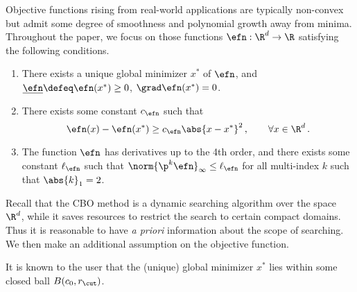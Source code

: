 \documentclass{amsart}
\begin{document}
Objective functions rising from real-world applications are typically non-convex but admit some degree of smoothness and polynomial growth away from minima. 
Throughout the paper, we focus on those functions $\efn: \R^d \to \R$ satisfying the following conditions. 
\begin{condition}
	\label{cd:efn-property}
	\begin{enumerate}
		\item There exists a unique global minimizer $x^\ast$ of $\efn$, and $\underline{\efn} \defeq \efn(x^\ast) \ge 0$, $\grad \efn(x^\ast) = 0$. 
		\item There exists some constant $c_\efn$ such that 
		\begin{equation*}
			\efn(x) - \efn(x^\ast) \ge c_\efn \abs{x - x^\ast}^2 \,, \qquad \forall x \in \R^d \,.
		\end{equation*} 

		\item The function $\efn$ has derivatives up to the 4th order, and there exists some constant $\ell_\efn$ such that $\norm{\p^k \efn}_\infty \le \ell_\efn$ for all multi-index $k$ such that $\abs{k}_1 = 2$. 
	\end{enumerate}
\end{condition}
Recall that the CBO method is a dynamic searching algorithm over the space $\R^d$, while it saves resources to restrict the search to certain compact domains. 
Thus it is reasonable to have \textit{a priori} information about the scope of searching. 
We then make an additional assumption on the objective function. 
\begin{assumption}
	\label{as:efn-restrict}
	It is known to the user that the (unique) global minimizer $x^\ast$ lies within some closed ball $B(c_0, r_\cut)$. 
\end{assumption}
\end{document}
